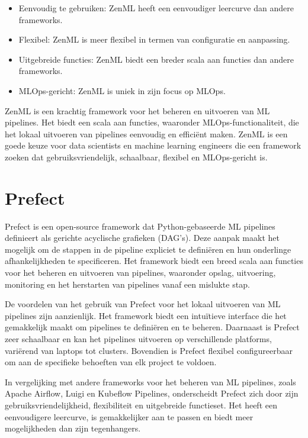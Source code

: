 \begin{itemize}
    \item Eenvoudig te gebruiken: ZenML heeft een eenvoudiger leercurve dan andere frameworks.
    \item Flexibel: ZenML is meer flexibel in termen van configuratie en aanpassing.
    \item Uitgebreide functies: ZenML biedt een breder scala aan functies dan andere frameworks.
    \item MLOps-gericht: ZenML is uniek in zijn focus op MLOps.
\end{itemize}

ZenML is een krachtig framework voor het beheren en uitvoeren van ML pipelines. Het biedt een scala aan functies, waaronder MLOps-functionaliteit, die het lokaal uitvoeren van pipelines eenvoudig en efficiënt maken. ZenML is een goede keuze voor data scientists en machine learning engineers die een framework zoeken dat gebruiksvriendelijk, schaalbaar, flexibel en MLOps-gericht is.

\section{Prefect}

Prefect is een open-source framework dat Python-gebaseerde ML pipelines definieert als gerichte acyclische grafieken (DAG's). Deze aanpak maakt het mogelijk om de stappen in de pipeline expliciet te definiëren en hun onderlinge afhankelijkheden te specificeren. Het framework biedt een breed scala aan functies voor het beheren en uitvoeren van pipelines, waaronder opslag, uitvoering, monitoring en het herstarten van pipelines vanaf een mislukte stap.

De voordelen van het gebruik van Prefect voor het lokaal uitvoeren van ML pipelines zijn aanzienlijk. Het framework biedt een intuïtieve interface die het gemakkelijk maakt om pipelines te definiëren en te beheren. Daarnaast is Prefect zeer schaalbaar en kan het pipelines uitvoeren op verschillende platforms, variërend van laptops tot clusters. Bovendien is Prefect flexibel configureerbaar om aan de specifieke behoeften van elk project te voldoen.

In vergelijking met andere frameworks voor het beheren van ML pipelines, zoals Apache Airflow, Luigi en Kubeflow Pipelines, onderscheidt Prefect zich door zijn gebruiksvriendelijkheid, flexibiliteit en uitgebreide functieset. Het heeft een eenvoudigere leercurve, is gemakkelijker aan te passen en biedt meer mogelijkheden dan zijn tegenhangers.

